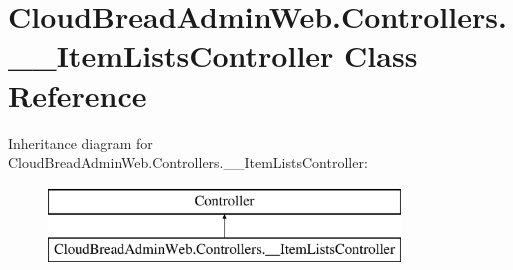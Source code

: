 \hypertarget{a00006}{}\section{Cloud\+Bread\+Admin\+Web.\+Controllers.\+\_\+\+\_\+\+Item\+Lists\+Controller Class Reference}
\label{a00006}
Inheritance diagram for Cloud\+Bread\+Admin\+Web.\+Controllers.\+\_\+\+\_\+\+Item\+Lists\+Controller\+:\begin{figure}[H]
\begin{center}
\leavevmode
\includegraphics[height=2.000000cm]{a00006}
\end{center}
\end{figure}
